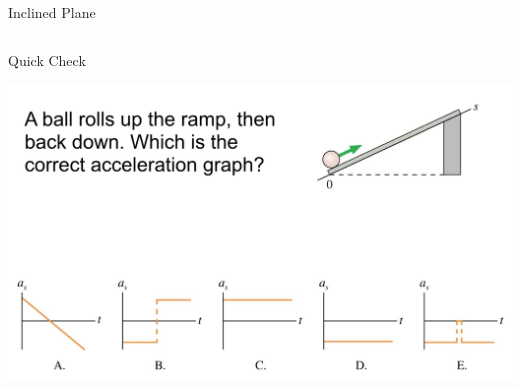 \documentclass{beamer}
\newcommand{\red}[1]{{\color{red}{#1}}}
\newcommand{\checkL}[2]{\begin{textblock*}{1cm}(#1,#2){\Large \red{\Checkmark}}\end{textblock*}}
\begin{document}
\begin{frame}{Inclined Plane}
\begin{columns}
\begin{column}{0.5\textwidth}
\end{column}
\begin{column}{0.5\textwidth}
\end{column}
\end{columns}
\end{frame}

\begin{frame}{Quick Check}
\begin{center}
   \includegraphics[width=\textwidth]{../figures/QC2_19.png}
\end{center}
\only<2->{\checkL{8.5cm}{7.6cm}}
\end{frame}
\end{document}
